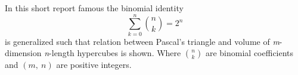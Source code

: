 In this short report famous the binomial identity \[\sum_{k=0}^{n}\binom{n}{k}=2^n\]
is generalized such that relation between Pascal's triangle and volume of \emph{m}-dimension \textit{n}-length
hypercubes is shown.
Where $\binom{n}{k}$ are binomial coefficients and $(m, \ n)$ are positive integers.
